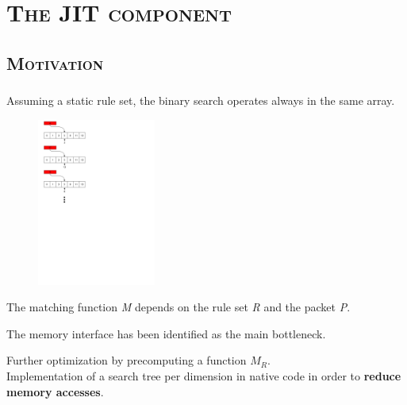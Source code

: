 \documentclass[xcolor=x11names,compress]{beamer}
\renewcommand{\(}{\begin{columns}}
\renewcommand{\)}{\end{columns}}
\newcommand{\<}[1]{\begin{column}{#1}}
\renewcommand{\>}{\end{column}}
\begin{document}
\section{\scshape The JIT component}
\subsection{\scshape Motivation}
\begin{frame}
  \frametitle{\insertsubsection}
  Assuming a static rule set, the binary search operates always in the same array.\\
  \begin{figure}
  \centering
  \includegraphics[height=5.5cm]{figures/matching_process}
  \end{figure}
\end{frame}

\begin{frame}
  \begin{tcolorbox}[colback=teal!5!white,colframe=teal!75!black,title=Reminder,drop fuzzy shadow]
  The matching function \textit{M} depends on the rule set \textit{R} and the packet \textit{P}.
  \end{tcolorbox}
  \begin{tcolorbox}[colback=red!5!white,colframe=red!75!black,title=Bottleneck,drop fuzzy shadow]
  The memory interface has been identified as the main bottleneck.
  \end{tcolorbox}
  \pause
  \begin{tcolorbox}[colback=blue!5!white,colframe=blue!75!black,title=Idea,drop fuzzy shadow]
  Further optimization by precomputing a function $M_R$.\\
  Implementation of a search tree per dimension in native code in order to \textbf{reduce memory accesses}.
  \end{tcolorbox}
\end{frame}
\end{document}
